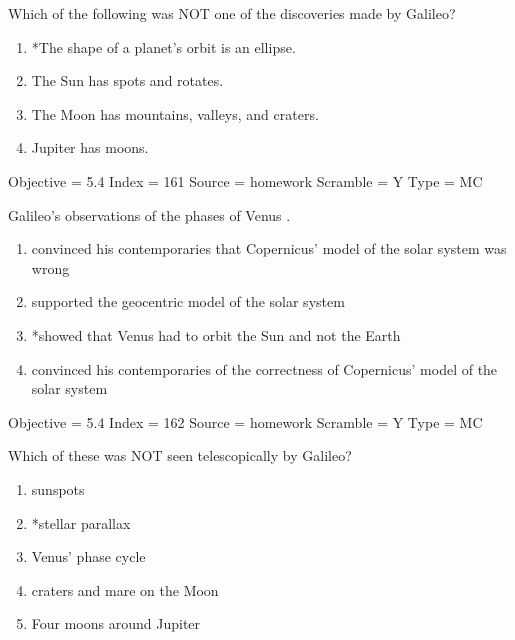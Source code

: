 \documentclass[11pt]{article}
\begin{document}
\begin{enumerate}
\begin{minipage}{\textwidth}
\begin{minipage}{\textwidth}
\item Which of the following was NOT one of the discoveries made by Galileo?
\begin{enumerate} 
\setlength{\itemsep}{1pt} 
\setlength{\parskip}{0pt} 
\setlength{\parsep}{0pt}
\setlength{\multicolsep}{1pt} 
\item *The shape of a planet's orbit is an ellipse.
\item The Sun has spots and rotates.
\item The Moon has mountains, valleys, and craters.
\item Jupiter has moons.
\end{enumerate} 
Objective = 5.4
Index = 161
Source = homework
Scramble = Y
Type = MC
\end{minipage}
\end{minipage}
\vskip 0.20in

\begin{minipage}{\textwidth}
\begin{minipage}{\textwidth}
\item Galileo's observations of the phases of Venus  \underline{\hspace{0.5in}}.
\begin{enumerate} 
\setlength{\itemsep}{1pt} 
\setlength{\parskip}{0pt} 
\setlength{\parsep}{0pt}
\setlength{\multicolsep}{1pt} 
\item convinced his contemporaries that Copernicus' model of the solar system was wrong
\item supported the geocentric model of the solar system
\item *showed that Venus had to orbit the Sun and not the Earth
\item convinced his contemporaries of the correctness of Copernicus' model of the solar system
\end{enumerate} 
Objective = 5.4
Index = 162
Source = homework
Scramble = Y
Type = MC
\end{minipage}
\end{minipage}
\vskip 0.20in

\begin{minipage}{\textwidth}
\begin{minipage}{\textwidth}
\item Which of these was NOT seen telescopically by Galileo?
\begin{multicols}{2}
\begin{enumerate} 
\setlength{\itemsep}{1pt} 
\setlength{\parskip}{0pt} 
\setlength{\parsep}{0pt}
\setlength{\multicolsep}{1pt} 
\item sunspots
\item *stellar parallax
\item Venus' phase cycle
\item craters and mare on the Moon
\item Four moons around Jupiter
\end{enumerate} 
\vfill 
\end{multicols}


\end{minipage}
\end{minipage}
\end{enumerate}
\end{document}
